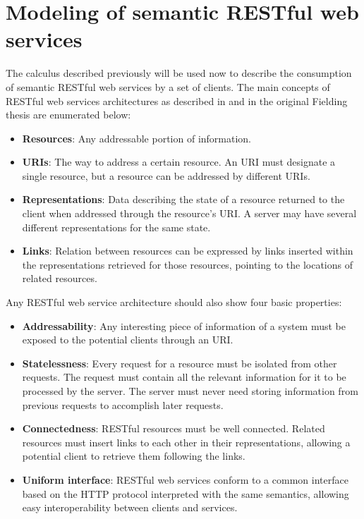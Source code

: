 \section{Modeling of semantic RESTful web services}
The calculus described previously will be used now to describe the consumption of semantic RESTful web services by a set of clients.
The main concepts of RESTful web services architectures as described in \cite{RichardsonRuby07} and in the original Fielding thesis \cite{Fiel00} are enumerated below:

\begin{itemize}
  \item {\bf Resources}: Any addressable portion of information.
  \item {\bf URIs}: The way to address a certain resource. An URI must designate a single resource, but a resource can be addressed by different URIs.
  \item {\bf Representations}: Data describing the state of a resource returned to the client when addressed through the resource's URI. A server may have several different representations for the same state.
  \item {\bf Links}: Relation between resources can be expressed by links inserted within the representations retrieved for those resources, pointing to the locations of related resources.
\end{itemize}

Any RESTful web service architecture should also show four basic properties:

\begin{itemize}
  \item {\bf Addressability}: Any interesting piece of information of a system must be exposed to the potential clients through an URI.
  \item {\bf Statelessness}: Every request for a resource must be isolated from other requests. The request must contain all the relevant information for it to be processed by the server. The server must never need storing information from previous requests to accomplish later requests.
  \item {\bf Connectedness}: RESTful resources must be well connected. Related resources must insert links to each other in their representations, allowing a potential client to retrieve them following the links.
  \item {\bf Uniform interface}: RESTful web services conform to a common interface based on the HTTP protocol interpreted with the same semantics, allowing easy interoperability between clients and services.
\end{itemize}


